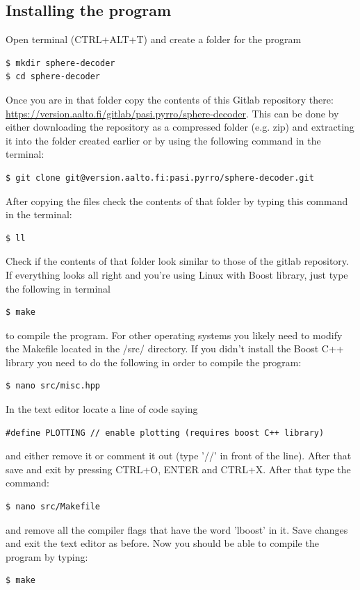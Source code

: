 \documentclass[english,12pt,a4paper,pdftex,sci,utf8]{aaltothesis}
\begin{document}
\subsection{Installing the program}

Open terminal (CTRL+ALT+T) and create a folder for the program 
\begin{verbatim}
$ mkdir sphere-decoder
$ cd sphere-decoder
\end{verbatim}Once you are in that folder copy the contents of this Gitlab repository there: \url{https://version.aalto.fi/gitlab/pasi.pyrro/sphere-decoder}. This can be done by either downloading the repository as a compressed folder (e.g. zip) and extracting it into the folder created earlier or by using the following command in the terminal:
\begin{verbatim}
$ git clone git@version.aalto.fi:pasi.pyrro/sphere-decoder.git
\end{verbatim}

\noindent After copying the files check the contents of that folder by typing this command in the terminal:
\begin{verbatim}
$ ll
\end{verbatim}
Check if the contents of that folder look similar to those of the gitlab repository. If everything looks all right and you're using Linux with Boost library, just type the following in terminal
\begin{verbatim}
$ make
\end{verbatim}
to compile the program. For other operating systems you likely need to modify the Makefile located in the /src/ directory. If you didn't install the Boost C++ library you need to do the following in order to compile the program:
\begin{verbatim}
$ nano src/misc.hpp
\end{verbatim}
In the text editor locate a line of code saying
\begin{verbatim}
#define PLOTTING // enable plotting (requires boost C++ library)
\end{verbatim}
and either remove it or comment it out (type '//' in front of the line). After that save and exit by pressing CTRL+O, ENTER and CTRL+X. After that type the command:
\begin{verbatim}
$ nano src/Makefile
\end{verbatim}
and remove all the compiler flags that have the word 'lboost' in it. Save changes and exit the text editor as before. Now you should be able to compile the program by typing:
\begin{verbatim}
$ make
\end{verbatim}
\end{document}
